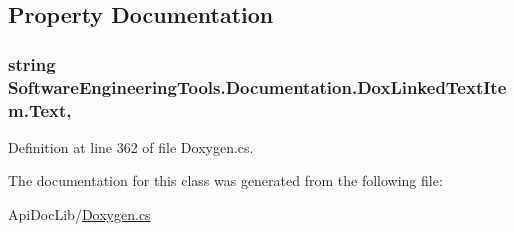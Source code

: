 \subsection{Property Documentation}
\hypertarget{class_software_engineering_tools_1_1_documentation_1_1_dox_linked_text_item_a2bb49a433d3cd0bae57d844da0743c7e}{
\subsubsection[{Text}]{\setlength{\rightskip}{0pt plus 5cm}string Software\+Engineering\+Tools.\+Documentation.\+Dox\+Linked\+Text\+Item.\+Text\hspace{0.3cm}{\ttfamily [get]}, {\ttfamily [set]}}}\label{class_software_engineering_tools_1_1_documentation_1_1_dox_linked_text_item_a2bb49a433d3cd0bae57d844da0743c7e}


Definition at line 362 of file Doxygen.\+cs.



The documentation for this class was generated from the following file\+:\begin{DoxyCompactItemize}
\item 
Api\+Doc\+Lib/\hyperlink{_doxygen_8cs}{Doxygen.\+cs}\end{DoxyCompactItemize}
